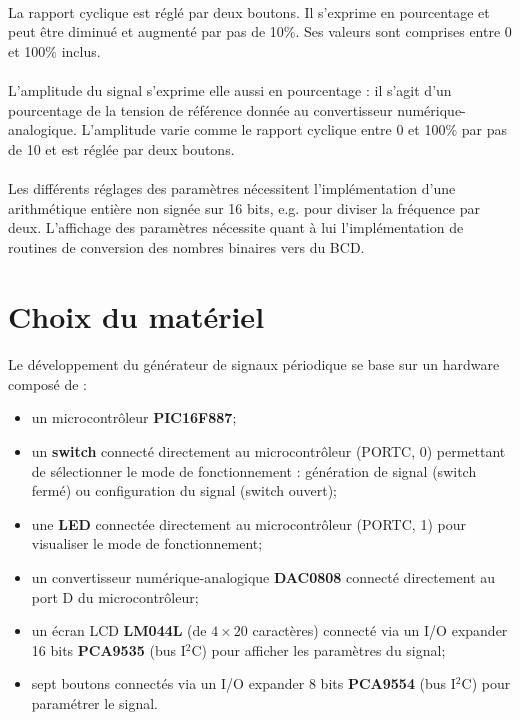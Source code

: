 \documentclass{article}
\begin{document}
    \paragraph{}
    La rapport cyclique est réglé par deux boutons. Il s'exprime en pourcentage et peut être diminué et augmenté par pas de 10\%. Ses valeurs sont comprises entre 0 et 100\% inclus.

    \paragraph{}
    L'amplitude du signal s'exprime elle aussi en pourcentage : il s'agit d'un pourcentage de la tension de référence donnée au convertisseur numérique-analogique. L'amplitude varie comme le rapport cyclique entre 0 et 100\% par pas de 10 et est réglée par deux boutons.

    \paragraph{}
    Les différents réglages des paramètres nécessitent l'implémentation d'une arithmétique entière non signée sur 16 bits, e.g. pour diviser la fréquence par deux. L'affichage des paramètres nécessite quant à lui l'implémentation de routines de conversion des nombres binaires vers du BCD.


    \section{Choix du matériel}
    \paragraph{}
    Le développement du générateur de signaux périodique se base sur un hardware composé de :
    \begin{itemize}[label=$\bullet$]
        \item un microcontrôleur \textbf{PIC16F887};
        \item un \textbf{switch} connecté directement au microcontrôleur (PORTC, 0) permettant de sélectionner le mode de fonctionnement : génération de signal (switch fermé) ou configuration du signal (switch ouvert);
        \item une \textbf{LED} connectée directement au microcontrôleur (PORTC, 1) pour visualiser le mode de fonctionnement;
        \item un convertisseur numérique-analogique \textbf{DAC0808} connecté directement au port D du microcontrôleur;
        \item un écran LCD \textbf{LM044L} (de $4\times 20$ caractères) connecté via un I/O expander 16 bits \textbf{PCA9535} (bus I$^2$C) pour afficher les paramètres du signal;
        \item sept boutons connectés via un I/O expander 8 bits \textbf{PCA9554} (bus I$^2$C) pour paramétrer le signal.
    \end{itemize}
\end{document}
